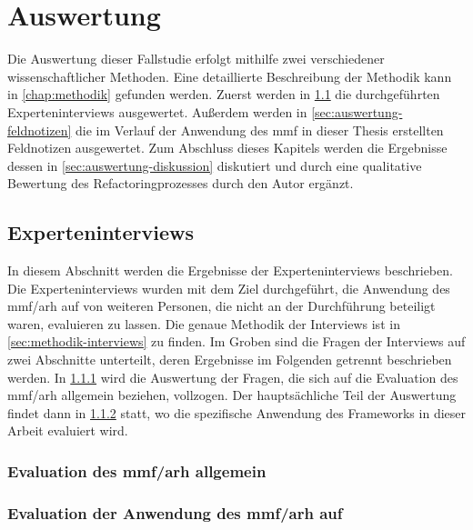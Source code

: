 \chapter{Auswertung}
\label{chap:auswertung}

Die Auswertung dieser Fallstudie erfolgt mithilfe zwei verschiedener wissenschaftlicher Methoden.
Eine detaillierte Beschreibung der Methodik kann in \cref{chap:methodik} gefunden werden.
Zuerst werden in \cref{sec:auswertung-interviews} die durchgeführten Experteninterviews ausgewertet.
Außerdem werden in \cref{sec:auswertung-feldnotizen} die im Verlauf der Anwendung des \gls{mmf} in dieser Thesis erstellten Feldnotizen ausgewertet.
Zum Abschluss dieses Kapitels werden die Ergebnisse dessen in \cref{sec:auswertung-diskussion} diskutiert und durch eine qualitative Bewertung des Refactoringprozesses durch den Autor ergänzt.

\section{Experteninterviews}
\label{sec:auswertung-interviews}

In diesem Abschnitt werden die Ergebnisse der Experteninterviews beschrieben.
Die Experteninterviews wurden mit dem Ziel durchgeführt, die Anwendung des \gls{mmf}/\gls{arh} auf \jf von weiteren Personen, die nicht an der Durchführung beteiligt waren, evaluieren zu lassen.
Die genaue Methodik der Interviews ist in \cref{sec:methodik-interviews} zu finden.
Im Groben sind die Fragen der Interviews auf zwei Abschnitte unterteilt, deren Ergebnisse im Folgenden getrennt beschrieben werden.
In \cref{sec:evaluation-mmf-allgemein} wird die Auswertung der Fragen, die sich auf die Evaluation des \gls{mmf}/\gls{arh} allgemein beziehen, vollzogen.
Der hauptsächliche Teil der Auswertung findet dann in \cref{sec:evaluation-mmf-anwendung} statt, wo die spezifische Anwendung des Frameworks in dieser Arbeit evaluiert wird.

\subsection{Evaluation des \gls{mmf}/\gls{arh} allgemein}
\label{sec:evaluation-mmf-allgemein}
\subsection{Evaluation der Anwendung des \gls{mmf}/\gls{arh} auf \jf}
\label{sec:evaluation-mmf-anwendung}


